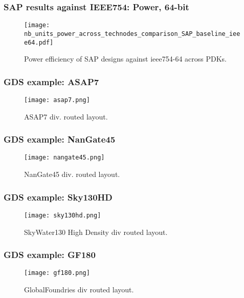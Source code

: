 \begin{frame}
    \frametitle{SAP results against IEEE754: Power, 64-bit}

	\begin{figure}[H]
	        \centering
	        \texttt{[image: nb\_units\_power\_across\_technodes\_comparison\_SAP\_baseline\_ieee64.pdf]}
		\caption{Power efficiency of SAP designs against ieee754-64 across PDKs.}
	\end{figure}
\end{frame}

\begin{frame}
    \frametitle{GDS example: ASAP7}

	\begin{figure}[H]
	        \centering
	        \texttt{[image: asap7.png]}
		\caption{ASAP7 div. routed layout.}
	\end{figure}
\end{frame}

\begin{frame}
    \frametitle{GDS example: NanGate45}

	\begin{figure}[H]
	        \centering
	        \texttt{[image: nangate45.png]}
		\caption{NanGate45 div. routed layout.}
	\end{figure}
\end{frame}

\begin{frame}
    \frametitle{GDS example: Sky130HD}

	\begin{figure}[H]
	        \centering
	        \texttt{[image: sky130hd.png]}
		\caption{SkyWater130 High Density div routed layout.}
	\end{figure}
\end{frame}

\begin{frame}
    \frametitle{GDS example: GF180}

	\begin{figure}[H]
	        \centering
	        \texttt{[image: gf180.png]}
		\caption{GlobalFoundries div routed layout.}
	\end{figure}
\end{frame}

